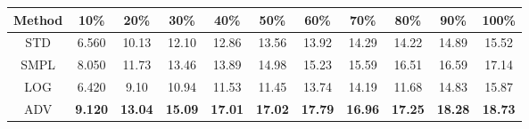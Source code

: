 \documentclass{standalone}
\begin{document}
\begin{tabular}{c|cccccccccc}
      \toprule
      Method & 10\% & 20\% & 30\% & 40\% & 50\% & 60\% & 70\% & 80\% & 90\% & 100\% \\
      \midrule
STD & 6.560 & 10.13 & 12.10 & 12.86 & 13.56 & 13.92 & 14.29 & 14.22 & 14.89 & 15.52\\
SMPL & 8.050 & 11.73 & 13.46 & 13.89 & 14.98 & 15.23 & 15.59 & 16.51 & 16.59 & 17.14\\
LOG & 6.420 & 9.10 & 10.94 & 11.53 & 11.45 & 13.74 & 14.19 & 11.68 & 14.83 & 15.87\\
ADV & \textbf{9.120} & \textbf{13.04} & \textbf{15.09} & \textbf{17.01} & \textbf{17.02} & \textbf{17.79} & \textbf{16.96} & \textbf{17.25} & \textbf{18.28} & \textbf{18.73}\\
  \bottomrule
\end{tabular}
\end{document}
